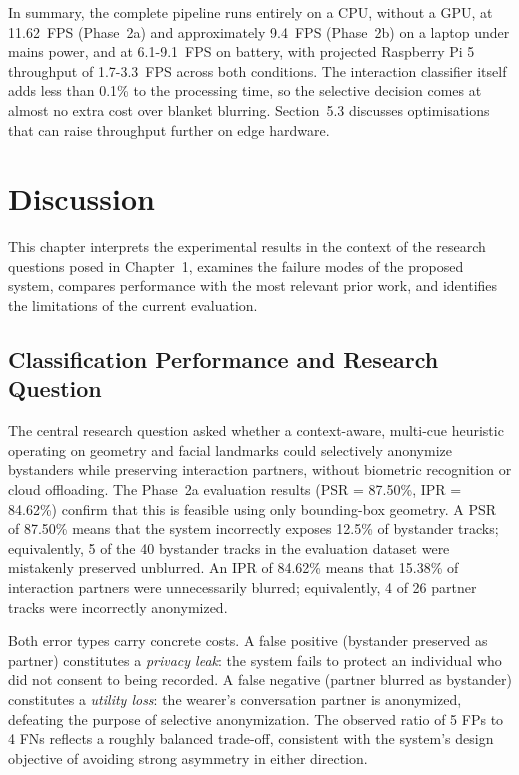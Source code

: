 In summary, the complete pipeline runs entirely on a CPU, without a GPU, at
11.62~FPS (Phase~2a) and approximately 9.4~FPS (Phase~2b) on a laptop under mains
power, and at 6.1-9.1~FPS on battery, with projected Raspberry Pi 5 throughput of
1.7-3.3~FPS across both conditions. The interaction classifier
itself adds less than 0.1\% to the processing time, so the selective decision comes
at almost no extra cost over blanket blurring. Section~5.3 discusses optimisations
that can raise throughput further on edge hardware.

\section{Discussion}
\label{sec:discussion}

This chapter interprets the experimental results in the context of the research
questions posed in Chapter~1, examines the failure modes of the proposed system,
compares performance with the most relevant prior work, and identifies the
limitations of the current evaluation.

\subsection{Classification Performance and Research Question}
\label{sec:disc_perf}

The central research question asked whether a context-aware, multi-cue heuristic
operating on geometry and facial landmarks could selectively anonymize bystanders
while preserving interaction partners, without biometric recognition or cloud
offloading. The Phase~2a evaluation results (PSR = 87.50\%, IPR = 84.62\%) confirm
that this is feasible using only bounding-box geometry. A PSR of 87.50\% means that
the system incorrectly exposes 12.5\% of bystander tracks; equivalently, 5 of the
40 bystander tracks in the evaluation dataset were mistakenly preserved unblurred.
An IPR of 84.62\% means that 15.38\% of interaction partners were unnecessarily
blurred; equivalently, 4 of 26 partner tracks were incorrectly anonymized.

Both error types carry concrete costs. A false positive (bystander preserved as
partner) constitutes a \emph{privacy leak}: the system fails to protect an
individual who did not consent to being recorded. A false negative (partner blurred
as bystander) constitutes a \emph{utility loss}: the wearer's conversation partner
is anonymized, defeating the purpose of selective anonymization. The observed ratio
of 5 FPs to 4 FNs reflects a roughly balanced trade-off, consistent with the
system's design objective of avoiding strong asymmetry in either direction.

